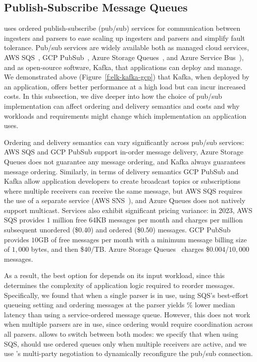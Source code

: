 \subsection{Publish-Subscribe Message Queues}\label{s:app:pubsub}
\etlapp uses ordered publish-subscribe (pub/sub) services for communication between ingesters and parsers to ease scaling up ingesters and parsers and simplify fault tolerance. 
Pub/sub services are widely available both as managed cloud services, \eg AWS SQS~\cite{sqs}, GCP PubSub~\cite{gcp-pubsub}, Azure Storage Queues~\cite{az-storage-queues}, and Azure Service Bus~\cite{az-service-bus}), and as open-source software, \eg Kafka, that applications can deploy and manage. We demonstrated above (Figure~\ref{f:elk-kafka-gcp}) that Kafka, when deployed by an application, offers \etlapp better performance at a high load but can incur increased costs. In this subsection, we dive deeper into how the choice of pub/sub implementation can affect ordering and delivery semantics and costs and why workloads and requirements might change which implementation an application uses.


Ordering and delivery semantics can vary significantly across pub/sub services: AWS SQS and GCP PubSub support in-order message delivery, Azure Storage Queues does not guarantee any message ordering, and Kafka always guarantees message ordering. Similarly, in terms of delivery semantics 
GCP PubSub and Kafka allow application developers to create broadcast topics or subscriptions where multiple receivers can receive the same message, but AWS SQS requires the use of a separate service (AWS SNS~\cite{sns}), and Azure Queues does not natively support multicast. Services also exhibit significant pricing variance: in 2023, AWS SQS provides $1$ million free 64KB messages per month and charges per million subsequent unordered (\$0.40) and ordered (\$$0.50$) messages.  GCP PubSub provides $10$GB of free messages per month with a minimum message billing size of $1,000$ bytes, and then \$$40$/TB. Azure Storage Queues~\cite{az-storage-queues} charges \$$0.004$/$10,000$ messages.



As a result, the best option for \etlapp depends on its input workload, since this determines the complexity of application logic required to reorder messages. 
Specifically, we found that when a single parser is in use,  using SQS's best-effort queueing setting and ordering messages at the parser yields \awsImprovementPct\% lower median latency than using a service-ordered message queue. However, this does not work when multiple parsers are in use, since ordering would require coordination across all parsers. 
\name allows \etlapp to switch between both modes: we specify that when using SQS, \etlapp should use ordered queues only when multiple receivers are active, and we use \name's multi-party negotiation to dynamically reconfigure the pub/sub connection.

